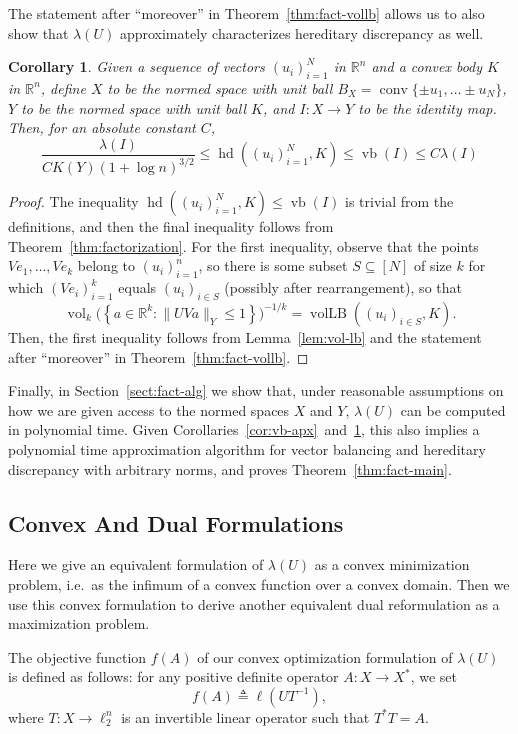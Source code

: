 \documentclass[11pt]{article}
\newtheorem{corollary}[theorem]{Corollary}
\newcommand{\R}{{\mathbb{R}}}
\newcommand{\eqdef}{\triangleq}
\newcommand{\set}[1]{\left\{ #1 \right\}}
\DeclareMathOperator{\vollb}{volLB}
\DeclareMathOperator{\hd}{hd}
\DeclareMathOperator{\vb}{vb}
\DeclareMathOperator{\vol}{vol}
\DeclareMathOperator{\conv}{conv}
\begin{document}
The statement after ``moreover'' in Theorem~\ref{thm:fact-vollb}
allows us to also show that $\lambda(U)$ approximately characterizes
hereditary discrepancy as well.
\begin{corollary}\label{cor:hd-apx}
  Given a sequence of vectors $(u_i)_{i = 1}^N$ in $\R^n$ and a convex
  body $K$ in $\R^n$, define $X$ to be the normed space with
  unit ball $B_X = \conv\{\pm u_1, \ldots \pm u_N\}$, $Y$ to be
  the normed space with unit ball $K$, and $I:X \to Y$ to be the
  identity map. Then, for an absolute constant $C$,
  \[
  \frac{\lambda(I)}{C K(Y) (1 + \log n)^{3/2}} 
  \le \hd((u_i)_{i = 1}^N, K) \le \vb(I) 
  \le C \lambda(I)
  \]
\end{corollary}
\begin{proof}
 The inequality $\hd((u_i)_{i = 1}^N, K) \le \vb(I)$ is trivial from
 the definitions, and then the final inequality follows from
 Theorem~\ref{thm:factorization}. For the first inequality, observe
 that the points $Ve_1, \ldots, Ve_k$ belong to $(u_i)_{i = 1}^n$, so
 there is some subset $S \subseteq [N]$ of size $k$ for which
 $(Ve_i)_{i = 1}^k$ equals $(u_i)_{i \in S}$ (possibly after
 rearrangement), so that 
 \[
 \vol_k\bigl(\set{a \in \R^k: \|UV a\|_Y \le 1}\bigr)^{-1/k} =
 \vollb((u_i)_{i \in S}, K).
 \]
 Then, the first inequality follows from Lemma~\ref{lem:vol-lb} and
 the statement after ``moreover'' in Theorem~\ref{thm:fact-vollb}.
\end{proof}

Finally, in Section~\ref{sect:fact-alg} we show that, under reasonable
assumptions on how we are given access to the normed spaces $X$ and
$Y$, $\lambda(U)$ can be computed in polynomial time. Given
Corollaries~\ref{cor:vb-apx}~and~\ref{cor:hd-apx}, this also implies a
polynomial time approximation algorithm for vector balancing and
hereditary discrepancy with arbitrary norms, and proves Theorem~\ref{thm:fact-main}.

\subsection{Convex And Dual Formulations}
\label{sect:fact-conv}

Here we give an equivalent formulation of $\lambda(U)$ as a convex
minimization problem, i.e.~as the infimum of a convex function over a
convex domain. Then we use this convex formulation to derive another
equivalent dual reformulation as a maximization problem.


The objective function $f(A)$ of our convex optimization formulation of
$\lambda(U)$ is defined as follows: for any positive definite
operator $A:X \to X^*$, we set
\begin{equation}
  \label{eq:obj-def}
  f(A) \eqdef \ell(UT^{-1}),
\end{equation}
where $T:X \to \ell_2^n$ is an invertible linear operator such that $T^*T = A$. 
\end{document}
